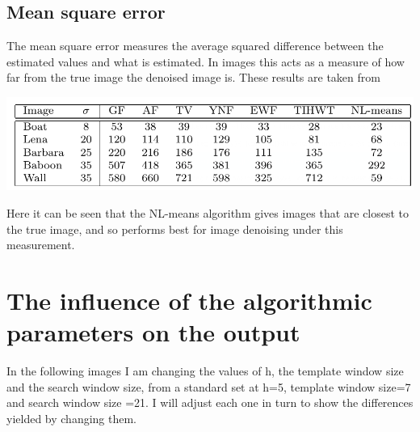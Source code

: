 \documentclass[11pt]{article}
\begin{document}
\subsection{Mean square error}
\cite{machine_2018}The mean square error measures the average squared difference between the estimated values and what is estimated. In images this acts as a measure of how far from the true image the denoised image is. These results are taken from \cite{buades_review_2005}
\begin{center}
	\includegraphics[scale=0.7]{"mean"}
\end{center}
Here it can be seen that the NL-means algorithm gives images that are closest to the true image, and so performs best for image denoising under this measurement.
\newpage
\section{The influence of the algorithmic parameters on the output}
In the following images I am changing the values of h, the template window size and the search window size, from a standard set at h=5, template window size=7 and search window size =21. I will adjust each one in turn to show the differences yielded by changing them.
\end{document}
